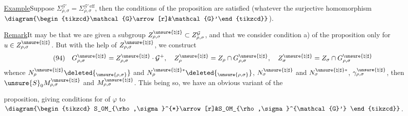 \uline{Example}\quad Suppose
\(\Sigma_{\rho,\sigma}^{\mathcal{G}'}=\Sigma_{\rho,\sigma}^{\mathcal{G}'\,\mathrm{eff}}\),
then the conditions of the proposition are 
satisfied (whatever the surjective homomorphism
\(\diagram{\begin{tikzcd}\mathcal{G}\arrow[r]&\mathcal{G}'\end{tikzcd}}\)).

\uline{Remark}\quad It may be that we are given a subgroup
\(Z_{\rho,\sigma}^{\unsure{\natural|\sharp}}\subset Z_{\rho,\sigma}^{\mathcal{G}}\),
and that we consider  condition a) of the proposition
only for \(u\in Z_{\rho,\sigma}^{\unsure{\natural|\sharp}}\).
But with the help of \(Z_{\rho,\sigma}^{\unsure{\natural|\sharp}}\), we construct
\[
(94)\quad
G_{\rho,\sigma}^{\unsure{\natural|\sharp}}=
Z_{\rho,\sigma}^{\unsure{\natural|\sharp}}\cdot\mathcal{G}^+,
\quad Z_\rho^{\unsure{\natural|\sharp}}=Z_\rho\cap G_{\rho,\sigma}^{\unsure{\natural|\sharp}},
\quad Z_\sigma^{\unsure{\natural|\sharp}}=Z_\sigma\cap G_{\rho,\sigma}^{\unsure{\natural|\sharp}}
\]
whence \(N_\rho^{\unsure{\natural|\sharp}}\deleted{_{\unsure{\rho,\sigma}}}\)
and \(N_\rho^{\unsure{\natural|\sharp}*}\deleted{_{\unsure{\rho,\sigma}}}\),
\(N_\sigma^{\unsure{\natural|\sharp}}\) and
\(N_\sigma^{\unsure{\natural|\sharp}*}\),
\(\gamma_{\rho,\sigma}^{\unsure{\natural|\sharp}}\), then
\(\unsure{S}_0M_{\rho,\sigma}^{\unsure{\natural|\sharp}}\) and
\(M_{\rho,\sigma}^{\unsure{\natural|\sharp}}\).
This being so, we have an obvious variant of the


proposition, giving conditions for  of \(\varphi\) to
\(\diagram{\begin{tikzcd}
S_0M_{\rho,\sigma}^{*}\arrow[r]&S_0M_{\rho,\sigma}^{\mathcal{G}'}
\end{tikzcd}}\).

